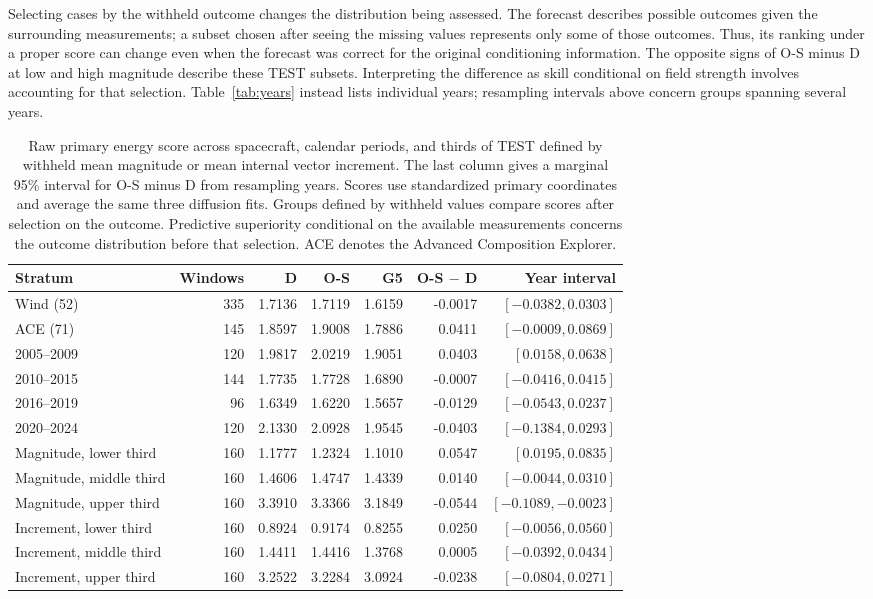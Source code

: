 \documentclass{article}
\begin{document}
Selecting cases by the withheld outcome changes the distribution being assessed. The forecast describes possible outcomes given the surrounding measurements; a subset chosen after seeing the missing values represents only some of those outcomes. Thus, its ranking under a proper score can change even when the forecast was correct for the original conditioning information. The opposite signs of O-S minus D at low and high magnitude describe these TEST subsets. Interpreting the difference as skill conditional on field strength involves accounting for that selection. Table~\ref{tab:years} instead lists individual years; resampling intervals above concern groups spanning several years.

\begin{table}[ht]
\centering
\caption{Raw primary energy score across spacecraft, calendar periods, and thirds of TEST defined by withheld mean magnitude or mean internal vector increment. The last column gives a marginal 95\% interval for O-S minus D from resampling years. Scores use standardized primary coordinates and average the same three diffusion fits. Groups defined by withheld values compare scores after selection on the outcome. Predictive superiority conditional on the available measurements concerns the outcome distribution before that selection. ACE denotes the Advanced Composition Explorer.}
\label{tab:strata}
\setlength{\tabcolsep}{5pt}
\begin{tabular}{@{}lrrrrrr@{}}
\toprule
Stratum & Windows & D & O-S & G5 & O-S $-$ D & Year interval \\
\midrule
Wind (52) & 335 & 1.7136 & 1.7119 & 1.6159 & -0.0017 & $[-0.0382,0.0303]$ \\
ACE (71) & 145 & 1.8597 & 1.9008 & 1.7886 & 0.0411 & $[-0.0009,0.0869]$ \\
2005--2009 & 120 & 1.9817 & 2.0219 & 1.9051 & 0.0403 & $[0.0158,0.0638]$ \\
2010--2015 & 144 & 1.7735 & 1.7728 & 1.6890 & -0.0007 & $[-0.0416,0.0415]$ \\
2016--2019 & 96 & 1.6349 & 1.6220 & 1.5657 & -0.0129 & $[-0.0543,0.0237]$ \\
2020--2024 & 120 & 2.1330 & 2.0928 & 1.9545 & -0.0403 & $[-0.1384,0.0293]$ \\
Magnitude, lower third & 160 & 1.1777 & 1.2324 & 1.1010 & 0.0547 & $[0.0195,0.0835]$ \\
Magnitude, middle third & 160 & 1.4606 & 1.4747 & 1.4339 & 0.0140 & $[-0.0044,0.0310]$ \\
Magnitude, upper third & 160 & 3.3910 & 3.3366 & 3.1849 & -0.0544 & $[-0.1089,-0.0023]$ \\
Increment, lower third & 160 & 0.8924 & 0.9174 & 0.8255 & 0.0250 & $[-0.0056,0.0560]$ \\
Increment, middle third & 160 & 1.4411 & 1.4416 & 1.3768 & 0.0005 & $[-0.0392,0.0434]$ \\
Increment, upper third & 160 & 3.2522 & 3.2284 & 3.0924 & -0.0238 & $[-0.0804,0.0271]$ \\
\bottomrule
\end{tabular}
\end{table}
\end{document}
